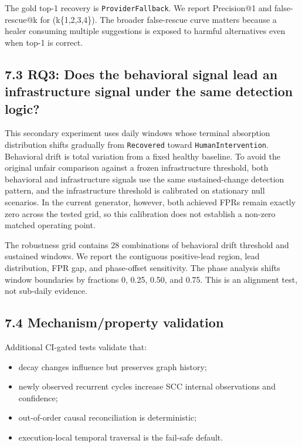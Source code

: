 \documentclass[
  11pt,
]{article}
\providecommand{\tightlist}{%
  \setlength{\itemsep}{0pt}\setlength{\parskip}{0pt}}
\begin{document}
The gold top-1 recovery is \texttt{ProviderFallback}. We report
Precision@1 and false-rescue@k for (k\in\{1,2,3,4\}). The broader
false-rescue curve matters because a healer consuming multiple
suggestions is exposed to harmful alternatives even when top-1 is
correct.

\subsection{7.3 RQ3: Does the behavioral signal lead an infrastructure
signal under the same detection logic?}\label{rq3-same-logic-degradation}

This secondary experiment uses daily windows whose terminal absorption
distribution shifts gradually from \texttt{Recovered} toward
\texttt{HumanIntervention}. Behavioral drift is total variation from a
fixed healthy baseline. To avoid the original unfair comparison against
a frozen infrastructure threshold, both behavioral and infrastructure
signals use the same sustained-change detection pattern, and the
infrastructure threshold is calibrated on stationary null scenarios.
In the current generator, however, both achieved FPRs remain exactly
zero across the tested grid, so this calibration does not establish a
non-zero matched operating point.

The robustness grid contains 28 combinations of behavioral drift
threshold and sustained windows. We report the contiguous positive-lead
region, lead distribution, FPR gap, and phase-offset sensitivity. The
phase analysis shifts window boundaries by fractions 0, 0.25, 0.50, and
0.75. This is an alignment test, not sub-daily evidence.

\subsection{7.4 Mechanism/property
validation}\label{mechanismproperty-validation}

Additional CI-gated tests validate that:

\begin{itemize}
\tightlist
\item
  decay changes influence but preserves graph history;
\item
  newly observed recurrent cycles increase SCC internal observations and
  confidence;
\item
  out-of-order causal reconciliation is deterministic;
\item
  execution-local temporal traversal is the fail-safe default.
\end{itemize}
\end{document}
